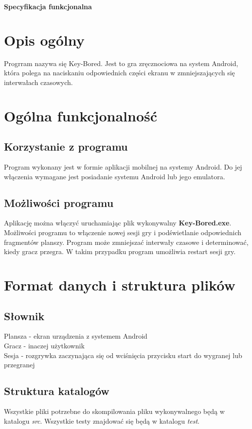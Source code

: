 \documentclass[11pt]{article}
\begin{document}
\begin{huge}
\begin{center}
\textbf{Specyfikacja funkcjonalna}
\end{center}
\end{huge}

\tableofcontents

\section{Opis ogólny}
Progrram nazywa się Key-Bored. Jest to gra zręcznociowa na system Android, która polega na naciskaniu odpowiednich części ekranu w zmniejszających się interwałach czasowych.

\section{Ogólna funkcjonalność}
\subsection{Korzystanie z programu}
Program wykonany jest w formie aplikacji mobilnej na systemy Android. Do jej włączenia wymagane jest posiadanie systemu Android lub jego emulatora.
\subsection{Możliwości programu}
Aplikację można włączyć uruchamiając plik wykonywalny \textbf{Key-Bored.exe}. Możliwości programu to włączenie nowej sesji gry i podświetlanie odpowiednich fragmentów planszy. Program może zmniejszać interwały czasowe i determinować, kiedy gracz przegra. W takim przypadku program umożliwia restart sesji gry.

\section{Format danych i struktura plików}
\subsection{Słownik}
Plansza - ekran urządzenia z systemem Android\\
Gracz - inaczej użytkownik\\
Sesja - rozgrywka zaczynająca się od wciśnięcia przycisku start do wygranej lub przegranej
\subsection{Struktura katalogów}
Wszystkie pliki potrzebne do skompilowania pliku wykonywalnego będą w katalogu \textit{src}. Wszystkie testy znajdować się będą w katalogu \textit{test}.
\end{document}
